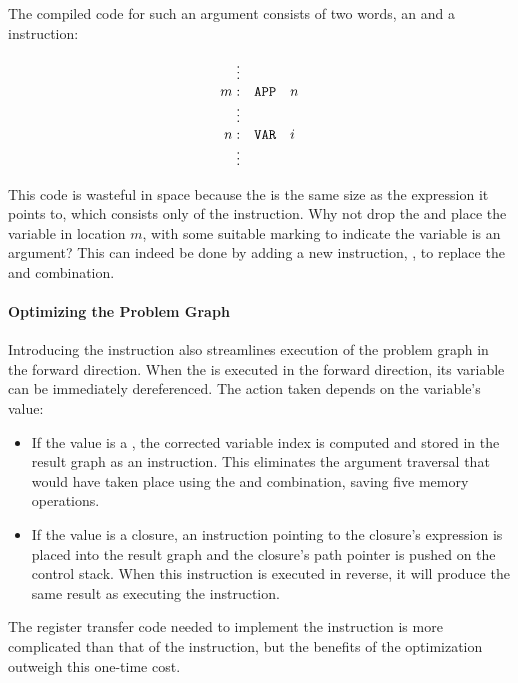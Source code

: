 The compiled code for such an argument consists of two words, an  and a
 instruction:

\[
\begin{array}{rll}
\vdots\\
m: & \texttt{APP} & n\\
\vdots\\
n: & \texttt{VAR} & i\\
\vdots
\end{array}
\]

This code is wasteful in space because the  is the same size as the
expression it points to, which consists only of the  instruction. Why not
drop the  and place the variable in location \(m\), with some suitable
marking to indicate the variable is an argument? This can indeed be done by adding
a new instruction, , to replace the  and 
combination.

\paragraph{Optimizing the Problem Graph}

Introducing the  instruction also streamlines execution of the
problem graph in the forward direction. When the  is executed in the
forward direction, its variable can be immediately dereferenced. The action taken
depends on the variable's value:

\begin{itemize}
\item If the value is a , the corrected variable index is computed and stored
in the result graph as an  instruction. This eliminates the argument
traversal that would have taken place using the  and 
combination, saving five memory operations.

\item If the value is a closure, an  instruction pointing to the closure's
expression is placed into the result graph and the closure's path pointer is pushed
on the control stack. When this  instruction is executed in reverse, it
will produce the same result as executing the  instruction.
\end{itemize}

The register transfer code needed to implement the  instruction is
more complicated than that of the  instruction, but the benefits of the
optimization outweigh this one-time cost.

